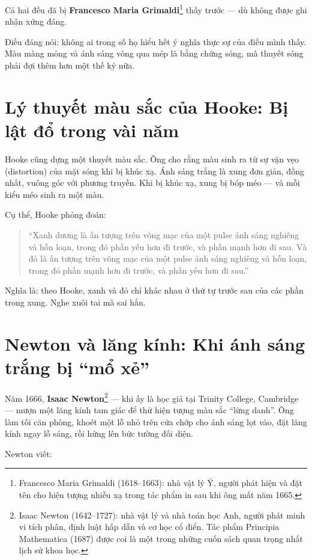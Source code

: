 Cả hai đều đã bị \textbf{Francesco Maria Grimaldi}\footnote{Francesco Maria Grimaldi (1618--1663): nhà vật lý Ý, người phát hiện và đặt tên cho hiện tượng nhiễu xạ trong tác phẩm in sau khi ông mất năm 1665.} thấy trước — dù không được ghi nhận xứng đáng.

Điều đáng nói: không ai trong số họ hiểu hết ý nghĩa thực sự của điều mình thấy. Màu màng mỏng và ánh sáng vòng qua mép là bằng chứng sóng, mà thuyết sóng phải đợi thêm hơn một thế kỷ nữa.


\section{Lý thuyết màu sắc của Hooke: Bị lật đổ trong vài năm}

Hooke cũng dựng một thuyết màu sắc. Ông cho rằng màu sinh ra từ sự vặn vẹo (distortion) của mặt sóng khi bị khúc xạ. Ánh sáng trắng là xung đơn giản, đồng nhất, vuông góc với phương truyền. Khi bị khúc xạ, xung bị bóp méo — và mỗi kiểu méo sinh ra một màu.

Cụ thể, Hooke phỏng đoán:

\begin{quote}
“Xanh dương là ấn tượng trên võng mạc của một pulse ánh sáng nghiêng và hỗn loạn, trong đó phần yếu hơn đi trước, và phần mạnh hơn đi sau. Và đỏ là ấn tượng trên võng mạc của một pulse ánh sáng nghiêng và hỗn loạn, trong đó phần mạnh hơn đi trước, và phần yếu hơn đi sau.”
\end{quote}

Nghĩa là: theo Hooke, xanh và đỏ chỉ khác nhau ở thứ tự trước sau của các phần trong xung. Nghe xuôi tai mà sai hẳn.


\section{Newton và lăng kính: Khi ánh sáng trắng bị “mổ xẻ”}

Năm 1666, \textbf{Isaac Newton}\footnote{Isaac Newton (1642--1727): nhà vật lý và nhà toán học Anh, người phát minh vi tích phân, định luật hấp dẫn và cơ học cổ điển. Tác phẩm Principia Mathematica (1687) được coi là một trong những cuốn sách quan trọng nhất lịch sử khoa học.} — khi ấy là học giả tại Trinity College, Cambridge — mượn một lăng kính tam giác để thử hiện tượng màu sắc ``lừng danh''. Ông làm tối căn phòng, khoét một lỗ nhỏ trên cửa chớp cho ánh sáng lọt vào, đặt lăng kính ngay lỗ sáng, rồi hứng lên bức tường đối diện.

Newton viết:

